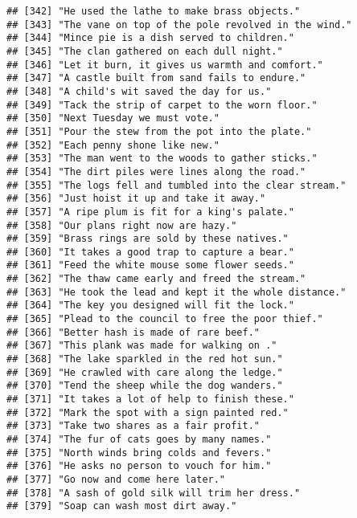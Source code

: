 \documentclass[
]{article}
\begin{document}
\begin{verbatim}
## [342] "He used the lathe to make brass objects."                 
## [343] "The vane on top of the pole revolved in the wind."        
## [344] "Mince pie is a dish served to children."                  
## [345] "The clan gathered on each dull night."                    
## [346] "Let it burn, it gives us warmth and comfort."             
## [347] "A castle built from sand fails to endure."                
## [348] "A child's wit saved the day for us."                      
## [349] "Tack the strip of carpet to the worn floor."              
## [350] "Next Tuesday we must vote."                               
## [351] "Pour the stew from the pot into the plate."               
## [352] "Each penny shone like new."                               
## [353] "The man went to the woods to gather sticks."              
## [354] "The dirt piles were lines along the road."                
## [355] "The logs fell and tumbled into the clear stream."         
## [356] "Just hoist it up and take it away."                       
## [357] "A ripe plum is fit for a king's palate."                  
## [358] "Our plans right now are hazy."                            
## [359] "Brass rings are sold by these natives."                   
## [360] "It takes a good trap to capture a bear."                  
## [361] "Feed the white mouse some flower seeds."                  
## [362] "The thaw came early and freed the stream."                
## [363] "He took the lead and kept it the whole distance."         
## [364] "The key you designed will fit the lock."                  
## [365] "Plead to the council to free the poor thief."             
## [366] "Better hash is made of rare beef."                        
## [367] "This plank was made for walking on ."                     
## [368] "The lake sparkled in the red hot sun."                    
## [369] "He crawled with care along the ledge."                    
## [370] "Tend the sheep while the dog wanders."                    
## [371] "It takes a lot of help to finish these."                  
## [372] "Mark the spot with a sign painted red."                   
## [373] "Take two shares as a fair profit."                        
## [374] "The fur of cats goes by many names."                      
## [375] "North winds bring colds and fevers."                      
## [376] "He asks no person to vouch for him."                      
## [377] "Go now and come here later."                              
## [378] "A sash of gold silk will trim her dress."                 
## [379] "Soap can wash most dirt away."                            

\end{verbatim}
\end{document}
